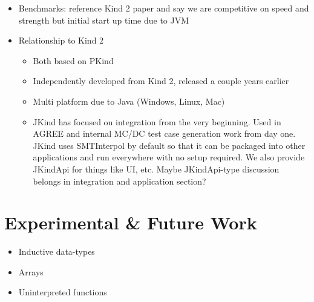 \documentclass{llncs}
\begin{document}
\begin{itemize}
\item Benchmarks: reference Kind 2 paper and say we are competitive on
  speed and strength but initial start up time due to JVM
\item Relationship to Kind 2~\cite{champion2016cav}
  \begin{itemize}
  \item Both based on PKind
  \item Independently developed from Kind 2, released a couple years earlier
  \item Multi platform due to Java (Windows, Linux, Mac)
  \item JKind has focused on integration from the very beginning. Used
    in AGREE and internal MC/DC test case generation work from day
    one. JKind uses SMTInterpol by default so that it can be packaged
    into other applications and run everywhere with no setup required.
    We also provide JKindApi for things like UI, etc. Maybe
    JKindApi-type discussion belongs in integration and application
    section?
  \end{itemize}
\end{itemize}

\section{Experimental \& Future Work}

\begin{itemize}
\item Inductive data-types
\item Arrays
\item Uninterpreted functions
\end{itemize}

{}

\end{document}
